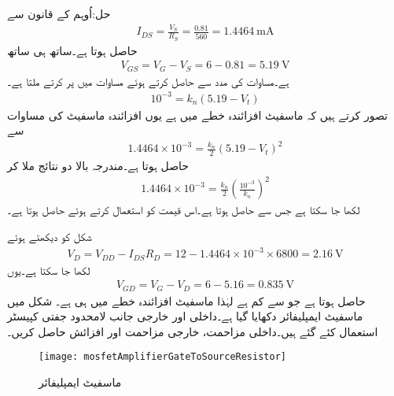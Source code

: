 حل:اُوہم کے قانون سے
\begin{align*}
I_{DS}=\frac{V_S}{R_S}=\frac{0.81}{560}=\SI{1.4464}{\milli \ampere}
\end{align*}
حاصل ہوتا ہے۔ساتھ ہی ساتھ
\begin{align*}
V_{GS}=V_G-V_S=6-0.81=\SI{5.19}{\volt}
\end{align*}
ہے۔مساوات  کی مدد سے  حاصل کرتے ہوئے مساوات  میں پر کرتے ملتا ہے۔
\begin{align*}
10^{-3}=k_n \left(5.19-V_t \right)
\end{align*}
تصور کرتے ہیں کہ ماسفیٹ افزائندہ خطے میں ہے یوں افزائندہ ماسفیٹ کی مساوات سے
\begin{align*}
1.4464 \times 10^{-3}=\frac{k_n}{2} \left(5.19-V_t \right)^2
\end{align*}
حاصل ہوتا ہے۔مندرجہ بالا دو نتائج ملا کر
\begin{align*}
1.4464 \times 10^{-3}=\frac{k_n}{2} \left( \frac{10^{-3}}{k_n}\right)^2
\end{align*}
لکھا جا سکتا ہے جس سے  حاصل ہوتا ہے۔اس قیمت کو استعمال کرتے ہوئے  حاصل ہوتا ہے۔

شکل کو دیکھتے ہوئے
\begin{align*}
V_D=V_{DD}-I_{DS} R_D=12-1.4464 \times 10^{-3} \times 6800=\SI{2.16}{\volt}
\end{align*}
لکھا جا سکتا ہے۔یوں
\begin{align*}
V_{GD}=V_G-V_D=6-5.16=\SI{0.835}{\volt}
\end{align*}
حاصل ہوتا ہے جو  سے کم ہے لہٰذا ماسفیٹ افزائندہ خطے میں ہی ہے۔
شکل  میں ماسفیٹ ایمپلیفائر دکھایا گیا ہے۔داخلی اور خارجی جانب لامحدود جفتی کپیسٹر استعمال کئے گئے ہیں۔داخلی مزاحمت، خارجی مزاحمت اور افزائش  حاصل کریں۔

\begin{figure}
\centering
\texttt{[image: mosfetAmplifierGateToSourceResistor]}
\caption{ماسفیٹ ایمپلیفائر}
\label{شکل_ماسفیٹ_ایمپلیفائر_مثال}
\end{figure}

